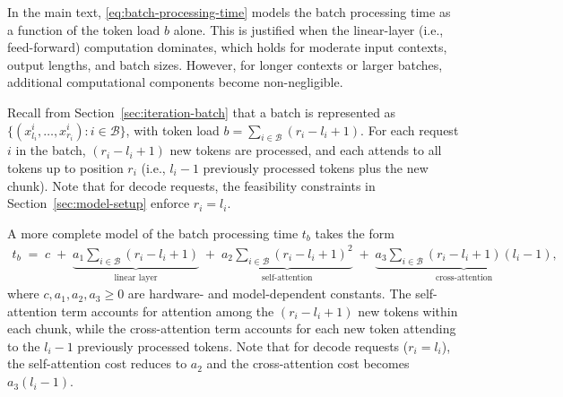 \documentclass[11pt]{article}
\theoremstyle{plain}
\theoremstyle{definition}
\theoremstyle{remark}
\begin{document}
In the main text, \cref{eq:batch-processing-time} models the batch processing time as a function of the token load $b$ alone. This is justified when the linear-layer (i.e., feed-forward) computation dominates, which holds for moderate input contexts, output lengths, and batch sizes. However, for longer contexts or larger batches, additional computational components become non-negligible.

Recall from Section~\ref{sec:iteration-batch} that a batch is represented as $\{(x^i_{l_i}, \dotsc, x^i_{r_i}) : i \in \mathcal{B}\}$, with token load $b = \sum_{i \in \mathcal{B}} (r_i - l_i + 1)$. For each request $i$ in the batch, $(r_i - l_i + 1)$ new tokens are processed, and each attends to all tokens up to position $r_i$ (i.e., $l_i - 1$ previously processed tokens plus the new chunk). Note that for decode requests, the feasibility constraints in Section~\ref{sec:model-setup} enforce $r_i = l_i$.

A more complete model of the batch processing time $t_b$ takes the form
\begin{align}
    t_b \;=\; c \;+\; \underbrace{a_1 \sum_{i \in \mathcal{B}} (r_i - l_i + 1)}_{\text{linear layer}} \;+\; \underbrace{a_2 \sum_{i \in \mathcal{B}} (r_i - l_i + 1)^2}_{\text{self-attention}} \;+\; \underbrace{a_3 \sum_{i \in \mathcal{B}} (r_i - l_i + 1)(l_i - 1)}_{\text{cross-attention}},
\end{align}
where $c, a_1, a_2, a_3 \geq 0$ are hardware- and model-dependent constants. The self-attention term accounts for attention among the $(r_i - l_i + 1)$ new tokens within each chunk, while the cross-attention term accounts for each new token attending to the $l_i - 1$ previously processed tokens. Note that for decode requests ($r_i = l_i$), the self-attention cost reduces to $a_2$ and the cross-attention cost becomes $a_3(l_i - 1)$.
\end{document}
